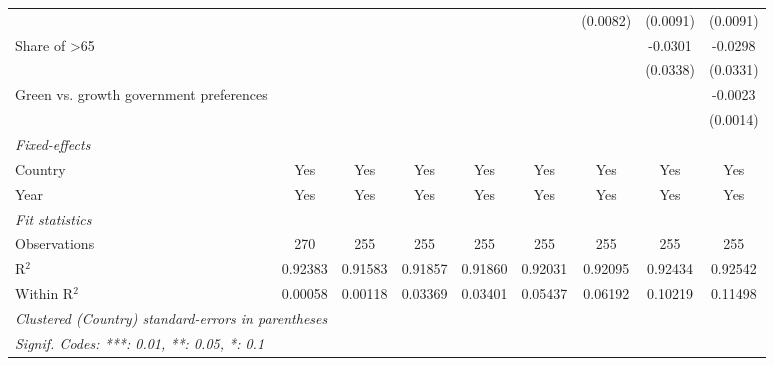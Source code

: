 \begin{table}[htbp]
\begin{tabular}{lcccccccc}
                                              &          &          &               &              &               & (0.0082)      & (0.0091) & (0.0091)\\   
      Share of >65                            &          &          &               &              &               &               & -0.0301  & -0.0298\\   
                                              &          &          &               &              &               &               & (0.0338) & (0.0331)\\   
      Green vs. growth government preferences &          &          &               &              &               &               &          & -0.0023\\   
                                              &          &          &               &              &               &               &          & (0.0014)\\   
      \midrule
      \emph{Fixed-effects}\\
      Country                                 & Yes      & Yes      & Yes           & Yes          & Yes           & Yes           & Yes      & Yes\\  
      Year                                    & Yes      & Yes      & Yes           & Yes          & Yes           & Yes           & Yes      & Yes\\  
      \midrule
      \emph{Fit statistics}\\
      Observations                            & 270      & 255      & 255           & 255          & 255           & 255           & 255      & 255\\  
      R$^2$                                   & 0.92383  & 0.91583  & 0.91857       & 0.91860      & 0.92031       & 0.92095       & 0.92434  & 0.92542\\  
      Within R$^2$                            & 0.00058  & 0.00118  & 0.03369       & 0.03401      & 0.05437       & 0.06192       & 0.10219  & 0.11498\\  
      \midrule \midrule
      \multicolumn{9}{l}{\emph{Clustered (Country) standard-errors in parentheses}}\\
      \multicolumn{9}{l}{\emph{Signif. Codes: ***: 0.01, **: 0.05, *: 0.1}}\\
   \end{tabular}
\end{table}


